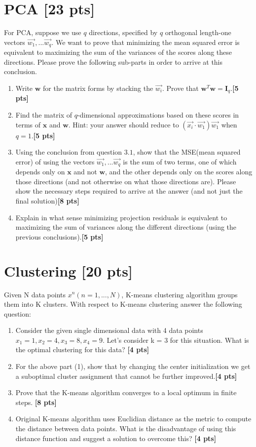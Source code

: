 \documentclass[11pt,epic]{article}
\begin{document}
\section{PCA [23 pts]}
For PCA, suppose we use $q$ directions, specified by $q$ orthogonal length-one vectors
$\vec{w_1},...\vec{w_q} $. We want to prove that minimizing the mean squared error is equivalent to maximizing the sum of the variances of the scores along these directions. Please prove the following sub-parts in order to arrive at this conclusion.
\begin{enumerate}
    \item Write $\boldsymbol {w}$ for the matrix forms by stacking the $\vec{w_i}$. Prove that $\boldsymbol{w}^T \boldsymbol{w} = \boldsymbol {I}_q$.\;\textbf{[5 pts]}
    \item  Find the matrix of $q$-dimensional approximations based on these scores in terms of $\boldsymbol{x}$ and $\boldsymbol{w}$. Hint: your answer should reduce to $(\vec{x_i} \cdot\vec{w_1})\vec{w_1}$ when $q = 1$.\;\textbf{[5 pts]}
    \item Using the conclusion from question $3.1$, show that the MSE(mean squared error) of using the vectors $\vec{w_1},...\vec{w_q}$ is the sum of two terms, one of which depends only on $\boldsymbol{x}$ and not $\boldsymbol{w}$, and the other depends only on the scores along those directions (and not otherwise on what those directions are). Please show the necessary steps required to arrive at the answer (and not just the final solution)\;\textbf{[8 pts]}
    \item  Explain in what sense minimizing projection residuals is equivalent to maximizing the sum of variances along the different directions (using the previous conclusions).\;\textbf{[5 pts]}
\end{enumerate}

\section{Clustering [20 pts]}
Given N data points $x^{n}(n = 1,...,N)$, K-means clustering algorithm groups them into K clusters. With respect to K-means clustering answer the following question:
\begin{enumerate}
    \item  Consider the given single dimensional data with 4 data points $x_1 = 1, x_2 = 4, x_3 = 8, x_4 = 9$. Let's consider k = 3 for this situation.  What is the optimal clustering for this data? \textbf{[4 pts]}
    \item For the above part (1), show that by changing the center initialization we get a suboptimal cluster assignment that cannot be further improved.\textbf{[4 pts]}
    \item Prove that the K-means algorithm converges to a local optimum in finite steps. \textbf{[8 pts]}
    \item Original K-means algorithm uses Euclidian distance as the metric to compute the distance between data points. What is the disadvantage of using this distance function and suggest a solution to overcome this? \textbf{[4 pts]}
\end{enumerate}
\end{document}
